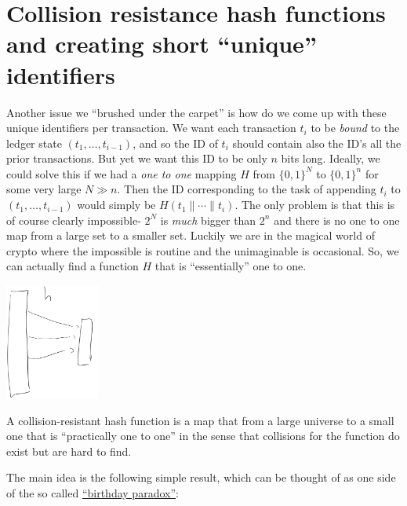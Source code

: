 \section{Collision resistance hash functions and creating short
``unique'' identifiers}\label{Collision-resistance-hash}

Another issue we ``brushed under the carpet'' is how do we come up with
these unique identifiers per transaction. We want each transaction
\(t_i\) to be \emph{bound} to the ledger state \((t_1,\ldots,t_{i-1})\),
and so the ID of \(t_i\) should contain also the ID's all the prior
transactions. But yet we want this ID to be only \(n\) bits long.
Ideally, we could solve this if we had a \emph{one to one} mapping \(H\)
from \(\{0,1\}^N\) to \(\{0,1\}^n\) for some very large \(N\gg n\). Then
the ID corresponding to the task of appending \(t_i\) to
\((t_1,\ldots,t_{i-1})\) would simply be \(H(t_1\|\cdots\|t_i)\). The
only problem is that this is of course clearly impossible- \(2^N\) is
\emph{much} bigger than \(2^n\) and there is no one to one map from a
large set to a smaller set. Luckily we are in the magical world of
crypto where the impossible is routine and the unimaginable is
occasional. So, we can actually find a function \(H\) that is
``essentially'' one to one.


\begin{marginfigure}
\centering
\includegraphics[width=\linewidth, height=1.5in, keepaspectratio]{../figure/hash_function.jpg}
\caption{A collision-resistant hash function is a map that from a large
universe to a small one that is ``practically one to one'' in the sense
that collisions for the function do exist but are hard to find.}
\label{tmplabelfig}
\end{marginfigure}

The main idea is the following simple result, which can be thought of as
one side of the so called \href{https://goo.gl/GSPrDW}{``birthday
paradox''}:

\hypertarget{randomcrhlem}{}

